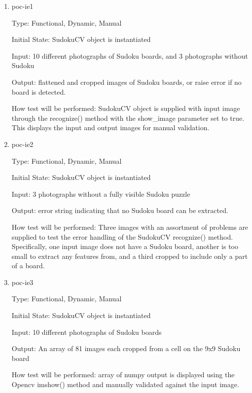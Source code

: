 \documentclass[11pt]{article}
\begin{document}
\begin{enumerate}

\item{poc-ie1\\}

Type: Functional, Dynamic, Manual
					
Initial State: SudokuCV object is instantiated
					
Input: 10 different photographs of Sudoku boards, and 3 photographs without Sudoku
					
Output: flattened and cropped images of Sudoku boards, or raise error if no board is detected.
					
How test will be performed: SudokuCV object is supplied with input image through the recognize() method with the show\_image parameter set to true. This displays the input and output images for manual validation.

\item{poc-ie2\\}

Type: Functional, Dynamic, Manual
					
Initial State: SudokuCV object is instantiated
					
Input: 3 photographs without a fully visible Sudoku puzzle
					
Output: error string indicating that no Sudoku board can be extracted.
					
How test will be performed: Three images with an assortment of problems are supplied to test the error handling of the SudokuCV recognize() method. Specifically, one input image does not have a Sudoku board, another is too small to extract any features from, and a third cropped to include only a part of a board.
					
\item{poc-ie3\\}

Type: Functional, Dynamic, Manual
					
Initial State: SudokuCV object is instantiated
					
Input: 10 different photographs of Sudoku boards
					
Output: An array of 81 images each cropped from a cell on the 9x9 Sudoku board
					
How test will be performed: array of numpy output is displayed using the Opencv imshow() method and manually validated against the input image.

\end{enumerate}
\end{document}
